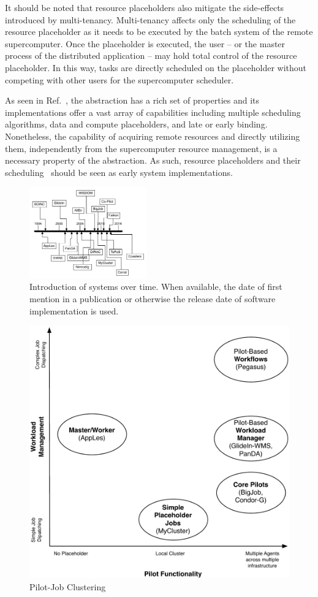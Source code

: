 \documentclass{sig-alternate}
\begin{document}
It should be noted that resource placeholders also mitigate the side-effects
introduced by multi-tenancy. Multi-tenancy affects only the scheduling of the
resource placeholder as it needs to be executed by the batch system of the
remote supercomputer. Once the placeholder is executed, the user -- or the
master process of the distributed application -- may hold total control of the
resource placeholder. In this way, tasks are directly scheduled on the
placeholder without competing with other users for the supercomputer scheduler.

As seen in Ref.~\cite{pstar-2012}, the \pilot abstraction has a rich set of
properties and its implementations offer a vast array of capabilities including
multiple scheduling algorithms, data and compute placeholders, and late or
early binding. Nonetheless, the capability of acquiring remote resources and
directly utilizing them, independently from the supercomputer resource
management, is a necessary property of the \pilot abstraction. As such,
resource placeholders and their
scheduling~\cite{Pinchak02practicalheterogeneous} should be seen as early
\pilot system implementations.


\begin{figure}[t]
  \centering
    \includegraphics[width=0.45\textwidth]{figures/timeline}
    \caption{Introduction of systems over time. When available, the date of
    first mention in a publication or otherwise the release date of software
    implementation is used.}
    \label{fig:timeline}
\end{figure}

\begin{figure}[t]
  \centering
    \includegraphics[width=.45\textwidth]{figures/pilotjob-clustering.pdf}
  \caption{Pilot-Job Clustering}
  \label{fig:pilotjob_clustering}
\end{figure}
\end{document}

